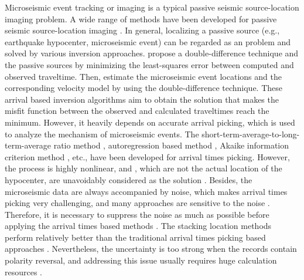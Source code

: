 Microseismic event tracking or imaging is a typical passive seismic source-location imaging problem. 
A wide range of methods have been developed for passive seismic source-location imaging . In general, localizing a passive source (e.g., earthquake hypocenter, microseismic event) can be regarded as an  problem and solved by various inversion approaches. 
\cite{Waldhauser2000A} propose a double-difference technique and  the passive sources by minimizing the least-squares error between computed and observed traveltime.
Then, \cite{2003Double} estimate the microseismic event locations and the corresponding velocity model by using the double-difference technique. 
These arrival  based inversion algorithms aim to obtain the solution that makes the misfit function between the observed and calculated traveltimes reach the minimum. 
However, it heavily depends on accurate arrival  picking, which is used to analyze the mechanism of microseismic events.  The short-term-average-to-long-term-average ratio method \cite[]{1978Automatic}, autoregression based method \cite[]{1999Multi}, Akaike information criterion method \cite[]{SLEEMAN1999265}, etc., have been developed for arrival times picking. 
However, the process is highly nonlinear, and , which are not the actual location of the hypocenter, are unavoidably considered as the solution \cite[]{Husen2003, Poliannikov2013A, Gesret2014Propagation, Nidhal2015}. Besides, the microseismic data are always accompanied by noise, which makes arrival times picking very challenging, and many approaches are sensitive to the noise \cite[]{Chen2018fast}. Therefore, it is necessary to suppress the noise as much as possible before applying the arrival times  based methods \cite[]{2015Microseismic, Juli2016A, 2016Hybrid}. The stacking location methods perform relatively better than the traditional arrival times picking  based approaches \cite[]{2005Reverse, 2007Localization, 2013Locating}. Nevertheless, the uncertainty is too strong when the records contain polarity reversal, and addressing this issue usually requires huge calculation resources \cite[]{2014Joint, Chuntao2016Joint}. 

